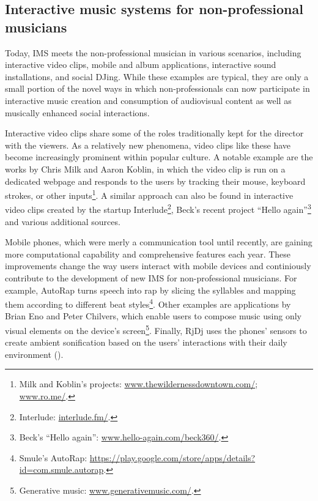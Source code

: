 \documentclass[a4paper,11pt]{article}
\begin{document}
\subsection{Interactive music systems for non-professional musicians}

Today, IMS meets the non-professional musician in various scenarios, including interactive video clips, mobile and album applications, interactive sound installations, and social DJing.
While these examples are typical, they are only a small portion of the novel ways in which non-professionals can now participate in interactive music creation and consumption of audiovisual content as well as musically enhanced social interactions.

Interactive video clips share some of the roles traditionally kept for the director with the viewers.
As a relatively new phenomena, video clips like these have become increasingly prominent within popular culture.
A notable example are the works by Chris Milk and Aaron Koblin, in which the video clip is run on a dedicated webpage and responds to the users by tracking their mouse, keyboard strokes, or other inputs\footnote{Milk and Koblin's projects: \href{http://www.thewildernessdowntown.com/}{www.thewildernessdowntown.com/}; \href{http://www.ro.me/}{www.ro.me/}.}.
A similar approach can also be found in interactive video clips created by the startup Interlude\footnote{Interlude: \href{http://interlude.fm/}{interlude.fm/}.}, Beck's recent project ``Hello again''\footnote{Beck's ``Hello again'': \href{http://www.hello-again.com/beck360/}{www.hello-again.com/beck360/}.} and various additional sources.

Mobile phones, which were merly a communication tool until recently, are gaining more computational capability and comprehensive features each year.
These improvements change the way users interact with mobile devices and continiously contribute to the development of new IMS for non-professional musicians.
For example, AutoRap turns speech into rap by slicing the syllables and mapping them according to different beat styles\footnote{Smule's AutoRap: \href{https://play.google.com/store/apps/details?id=com.smule.autorap}{https://play.google.com/store/apps/details?id=com.smule.autorap}.}.
Other examples are applications by Brian Eno and Peter Chilvers, which enable users to compose music using only visual elements on the device's screen\footnote{Generative music: \href{http://www.generativemusic.com/}{www.generativemusic.com/}.}.
Finally, RjDj uses the phones' sensors to create ambient sonification based on the users' interactions with their daily environment (\cite{web:rjdj})\label{rjdj}.
\end{document}
